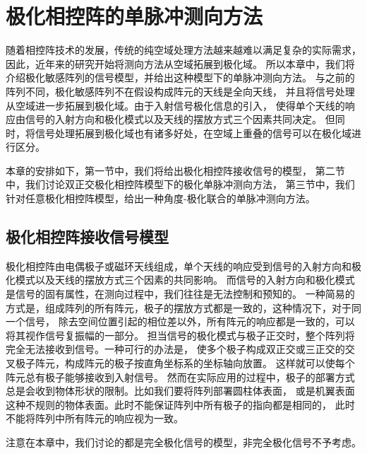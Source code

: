 \documentclass[master]{thesis-uestc}
\begin{document}
\chapter{极化相控阵的单脉冲测向方法}
随着相控阵技术的发展，传统的纯空域处理方法越来越难以满足复杂的实际需求，因此，近年来的研究开始将测向方法从空域拓展到极化域。
所以本章中，我们将介绍极化敏感阵列的信号模型，并给出这种模型下的单脉冲测向方法。
与之前的阵列不同，极化敏感阵列不在假设构成阵元的天线是全向天线，
并且将信号处理从空域进一步拓展到极化域。由于入射信号极化信息的引入，
使得单个天线的响应由信号的入射方向和极化模式以及天线的摆放方式三个因素共同决定。
但同时，将信号处理拓展到极化域也有诸多好处，在空域上重叠的信号可以在极化域进行区分。

本章的安排如下，第一节中，我们将给出极化相控阵接收信号的模型，
第二节中，我们讨论双正交极化相控阵模型下的极化单脉冲测向方法，
第三节中，我们针对任意极化相控阵模型，给出一种角度-极化联合的单脉冲测向方法。

\section{极化相控阵接收信号模型}
极化相控阵由电偶极子或磁环天线组成，单个天线的响应受到信号的入射方向和极化模式以及天线的摆放方式三个因素的共同影响。
而信号的入射方向和极化模式是信号的固有属性，在测向过程中，我们往往是无法控制和预知的。
一种简易的方式是，组成阵列的所有阵元，极子的摆放方式都是一致的，这种情况下，对于同一个信号，
除去空间位置引起的相位差以外，所有阵元的响应都是一致的，可以将其视作信号复振幅的一部分。
担当信号的极化模式与极子正交时，整个阵列将完全无法接收到信号。一种可行的办法是，
使多个极子构成双正交或三正交的交叉极子阵元，构成阵元的极子按直角坐标系的坐标轴向放置。
这样就可以使每个阵元总有极子能够接收到入射信号。
然而在实际应用的过程中，极子的部署方式总是会收到物体形状的限制。比如我们要将阵列部署圆柱体表面，
或是机翼表面这种不规则的物体表面。此时不能保证阵列中所有极子的指向都是相同的，
此时不能将阵列中所有阵元的响应视为一致。

注意在本章中，我们讨论的都是完全极化信号的模型，非完全极化信号不予考虑。
\end{document}
